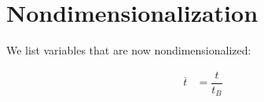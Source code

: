 \documentclass[12pt]{article}
\title{}
\author{}
\date{}
\newcommand{\ob}[1]{ \overline{#1} }
\begin{document}
\begin{titlepage}
\maketitle
\thispagestyle{empty}


\end{titlepage}

\section{}\label{}

\newcommand{\ob}[1]{ \overline{#1} }
\section{Nondimensionalization}
We list variables that are now nondimensionalized:

\begin{align}
\ob{t} &= \dfrac{t}{t_B} \
\end{align}



\end{document}
